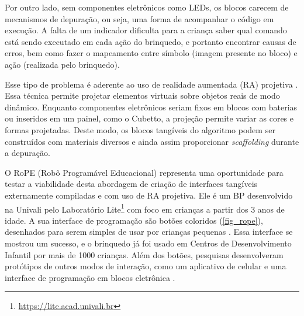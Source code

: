 
Por outro lado, sem componentes eletrônicos como LEDs, os blocos carecem de mecanismos de depuração, ou seja, uma forma de acompanhar o código em execução. A falta de um indicador dificulta para a criança saber qual comando está sendo executado em cada ação do brinquedo, e portanto encontrar causas de erros, bem como fazer o mapeamento entre símbolo (imagem presente no bloco) e ação (realizada pelo brinquedo).

Esse tipo de problema é aderente ao uso de realidade aumentada (RA) projetiva \cite{roberto_dynamic_2013}. Essa técnica permite projetar elementos virtuais sobre objetos reais de modo dinâmico. Enquanto componentes eletrônicos seriam fixos em blocos com baterias ou inseridos em um painel, como o Cubetto, a projeção permite variar as cores e formas projetadas. Deste modo, os blocos tangíveis do algoritmo podem ser construídos com materiais diversos e ainda assim proporcionar \textit{scaffolding} durante a depuração.

O RoPE (Robô Programável Educacional) representa uma oportunidade para testar a viabilidade desta abordagem de criação de interfaces tangíveis externamente compiladas e com uso de RA projetiva. Ele é um BP desenvolvido na Univali pelo Laboratório Lite\footnote{\url{https://lite.acad.univali.br}} com foco em crianças a partir dos 3 anos de idade. A sua interface de programação são botões coloridos (\autoref{fig_rope}), desenhados para serem simples de usar por crianças pequenas \cite{raabe_2017_rope}. Essa interface se mostrou um sucesso, e o brinquedo já foi usado em Centros de Desenvolvimento Infantil por mais de 1000 crianças. Além dos botões, pesquisas desenvolveram protótipos de outros modos de interação, como um aplicativo de celular \cite{viana_cesar_interface_2018} e uma interface de programação em blocos eletrônica \cite{metzger_desenvolvimento_2018}.


